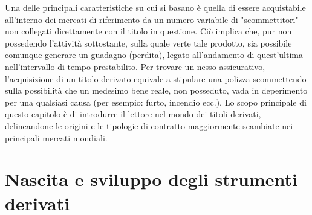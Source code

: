 \documentclass[12pt,a4paper]{report}
\begin{document}
Una delle principali caratteristiche su cui si basano è quella di essere acquistabile all'interno dei mercati di riferimento da un numero variabile di "scommettitori" non collegati direttamente con il titolo in questione. Ciò implica che, pur non possedendo l'attività sottostante, sulla quale verte tale prodotto, sia possibile comunque generare un guadagno (perdita), legato all'andamento di quest'ultima nell'intervallo di tempo prestabilito. Per trovare un nesso assicurativo, l'acquisizione di un titolo derivato equivale a stipulare una polizza scommettendo sulla possibilità che un medesimo bene reale, non posseduto, vada in deperimento per una qualsiasi causa (per esempio: furto, incendio ecc.). 
Lo scopo principale di questo capitolo è di introdurre il lettore nel mondo dei titoli derivati, delineandone le origini e le tipologie di contratto maggiormente scambiate nei principali mercati mondiali.


\section{Nascita e sviluppo degli strumenti derivati}
\end{document}
